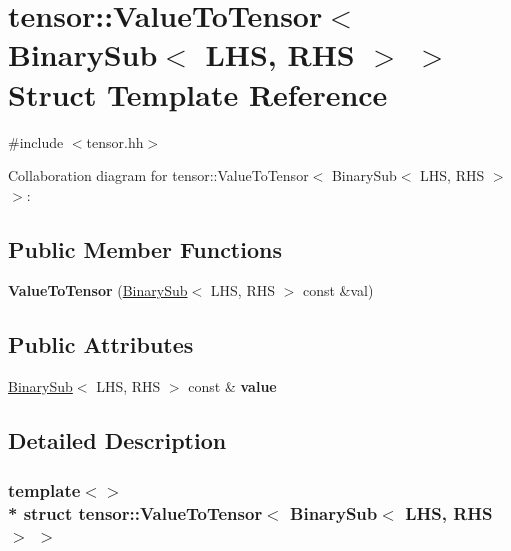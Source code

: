 \hypertarget{structtensor_1_1ValueToTensor_3_01BinarySub_3_01LHS_00_01RHS_01_4_01_4}{}\section{tensor\+:\+:Value\+To\+Tensor$<$ Binary\+Sub$<$ L\+HS, R\+HS $>$ $>$ Struct Template Reference}
\label{structtensor_1_1ValueToTensor_3_01BinarySub_3_01LHS_00_01RHS_01_4_01_4}


{\ttfamily \#include $<$tensor.\+hh$>$}



Collaboration diagram for tensor\+:\+:Value\+To\+Tensor$<$ Binary\+Sub$<$ L\+HS, R\+HS $>$ $>$\+:
\subsection*{Public Member Functions}
\begin{DoxyCompactItemize}
\item 
{\bfseries Value\+To\+Tensor} (\hyperlink{classtensor_1_1BinarySub}{Binary\+Sub}$<$ L\+HS, R\+HS $>$ const \&val)\hypertarget{structtensor_1_1ValueToTensor_3_01BinarySub_3_01LHS_00_01RHS_01_4_01_4_a599bdef9b97321c3ff8b8c28a4c18929}{}\label{structtensor_1_1ValueToTensor_3_01BinarySub_3_01LHS_00_01RHS_01_4_01_4_a599bdef9b97321c3ff8b8c28a4c18929}

\end{DoxyCompactItemize}
\subsection*{Public Attributes}
\begin{DoxyCompactItemize}
\item 
\hyperlink{classtensor_1_1BinarySub}{Binary\+Sub}$<$ L\+HS, R\+HS $>$ const \& {\bfseries value}\hypertarget{structtensor_1_1ValueToTensor_3_01BinarySub_3_01LHS_00_01RHS_01_4_01_4_a62345ffc9212a144b42ec36f3a635118}{}\label{structtensor_1_1ValueToTensor_3_01BinarySub_3_01LHS_00_01RHS_01_4_01_4_a62345ffc9212a144b42ec36f3a635118}

\end{DoxyCompactItemize}


\subsection{Detailed Description}
\subsubsection*{template$<$$>$\\*
struct tensor\+::\+Value\+To\+Tensor$<$ Binary\+Sub$<$ L\+H\+S, R\+H\+S $>$ $>$}

